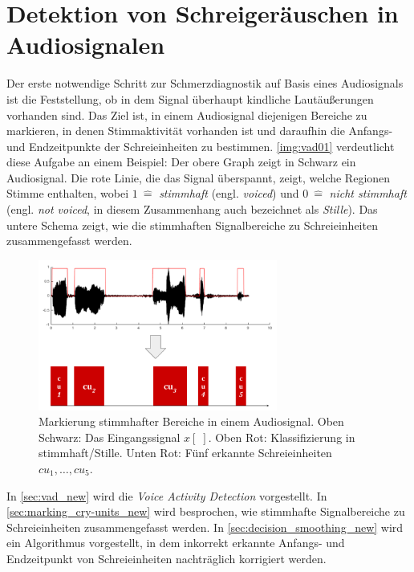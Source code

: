 \chapter{Detektion von Schreigeräuschen in Audiosignalen}
\label{sec:vad}

Der erste notwendige Schritt zur Schmerzdiagnostik auf Basis eines Audiosignals ist die Feststellung, ob in dem Signal überhaupt kindliche Lautäußerungen vorhanden sind. Das Ziel ist, in einem Audiosignal diejenigen Bereiche zu markieren, in denen Stimmaktivität vorhanden ist und daraufhin die Anfangs- und Endzeitpunkte  der Schreieinheiten zu bestimmen. \autoref{img:vad01} verdeutlicht diese Aufgabe an einem Beispiel: Der obere Graph zeigt in Schwarz ein Audiosignal. Die rote Linie, die das Signal überspannt, zeigt, welche Regionen Stimme enthalten, wobei $1 \: \hat{=} $ \emph{stimmhaft} (engl. \emph{voiced}) und $0 \: \hat{=}  $ \emph{nicht stimmhaft} (engl. \emph{not voiced}, in diesem Zusammenhang auch bezeichnet als \emph{Stille}). Das untere Schema zeigt, wie die stimmhaften Signalbereiche zu Schreieinheiten zusammengefasst werden.

\begin{figure}[h]
	\centering
	\includegraphics[width=0.7\textwidth]{bilder/vad_introduction02.png}
	\caption[Markierung stimmhafter Bereiche in einem Audiosignal]{Markierung stimmhafter Bereiche in einem Audiosignal. Oben Schwarz: Das Eingangssignal $x[\;]$. Oben Rot: Klassifizierung in stimmhaft/Stille. Unten Rot: Fünf erkannte Schreieinheiten $cu_1 , \ldots , cu_5$.}
	\label{img:vad01}
\end{figure}

In \autoref{sec:vad_new} wird die \emph{Voice Activity Detection} vorgestellt. In \autoref{sec:marking_cry-units_new} wird besprochen, wie stimmhafte Signalbereiche zu Schreieinheiten zusammengefasst werden. In \autoref{sec:decision_smoothing_new} wird ein Algorithmus vorgestellt, in dem inkorrekt erkannte Anfangs- und Endzeitpunkt von Schreieinheiten nachträglich korrigiert werden.

